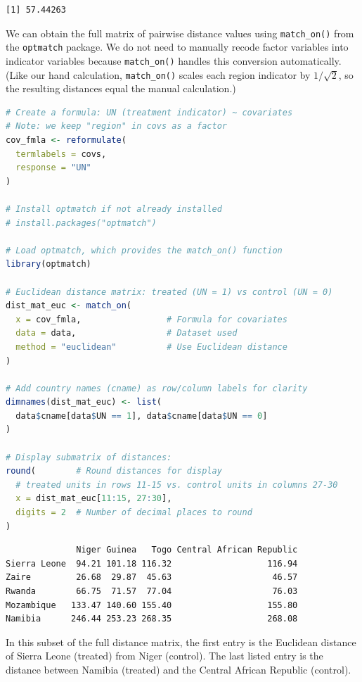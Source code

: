 \documentclass[twoside,11pt]{article}
\begin{document}
\begin{verbatim}
[1] 57.44263
\end{verbatim}



We can obtain the full matrix of pairwise distance values using
\texttt{match\_on()} from the \texttt{optmatch} package. We do not need
to manually recode factor variables into indicator variables because
\texttt{match\_on()} handles this conversion automatically. (Like our hand
calculation, \texttt{match\_on()} scales each region indicator by
\(1/\sqrt{2}\), so the resulting distances equal the manual calculation.)



\begin{lstlisting}[language=R]
# Create a formula: UN (treatment indicator) ~ covariates
# Note: we keep "region" in covs as a factor
cov_fmla <- reformulate(
  termlabels = covs,
  response = "UN"
)

# Install optmatch if not already installed
# install.packages("optmatch")

# Load optmatch, which provides the match_on() function
library(optmatch)

# Euclidean distance matrix: treated (UN = 1) vs control (UN = 0)
dist_mat_euc <- match_on(
  x = cov_fmla,                 # Formula for covariates
  data = data,                  # Dataset used
  method = "euclidean"          # Use Euclidean distance
)

# Add country names (cname) as row/column labels for clarity
dimnames(dist_mat_euc) <- list(
  data$cname[data$UN == 1], data$cname[data$UN == 0]
)

# Display submatrix of distances:
round(        # Round distances for display
  # treated units in rows 11-15 vs. control units in columns 27-30
  x = dist_mat_euc[11:15, 27:30],
  digits = 2  # Number of decimal places to round
)
\end{lstlisting}

\begin{verbatim}
              Niger Guinea   Togo Central African Republic
Sierra Leone  94.21 101.18 116.32                   116.94
Zaire         26.68  29.87  45.63                    46.57
Rwanda        66.75  71.57  77.04                    76.03
Mozambique   133.47 140.60 155.40                   155.80
Namibia      246.44 253.23 268.35                   268.08
\end{verbatim}



In this subset of the full distance matrix, the first entry is the
Euclidean distance of Sierra Leone (treated) from Niger (control). The
last listed entry is the distance between Namibia (treated) and the
Central African Republic (control).
\end{document}
